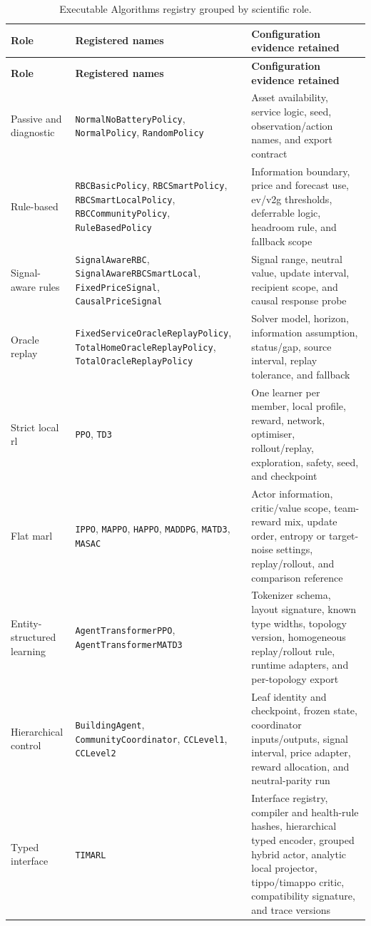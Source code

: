 \begin{longtable}{@{}p{}p{}p{}@{}}
\caption{Executable Algorithms registry grouped by scientific role.}\label{tab:app-controller-registry}\\
\toprule
\textbf{Role} & \textbf{Registered names} & \textbf{Configuration evidence retained} \\
\midrule
\endfirsthead
\toprule
\textbf{Role} & \textbf{Registered names} & \textbf{Configuration evidence retained} \\
\midrule
\endhead
Passive and diagnostic & \texttt{NormalNoBatteryPolicy}, \texttt{NormalPolicy}, \texttt{RandomPolicy} & Asset availability, service logic, seed, observation/action names, and export contract \\
Rule-based & \texttt{RBCBasicPolicy}, \texttt{RBCSmartPolicy}, \texttt{RBCSmartLocalPolicy}, \texttt{RBCCommunityPolicy}, \texttt{RuleBasedPolicy} & Information boundary, price and forecast use, \gls{ev}/\gls{v2g} thresholds, deferrable logic, headroom rule, and fallback scope \\
Signal-aware rules & \texttt{SignalAwareRBC}, \texttt{SignalAwareRBC\allowbreak SmartLocal}, \texttt{FixedPriceSignal}, \texttt{CausalPriceSignal} & Signal range, neutral value, update interval, recipient scope, and causal response probe \\
Oracle replay & \texttt{FixedServiceOracle\allowbreak ReplayPolicy}, \texttt{TotalHomeOracle\allowbreak ReplayPolicy}, \texttt{TotalOracleReplay\allowbreak Policy} & Solver model, horizon, information assumption, status/gap, source interval, replay tolerance, and fallback \\
Strict local \gls{rl} & \texttt{PPO}, \texttt{TD3} & One learner per member, local profile, reward, network, optimiser, rollout/replay, exploration, safety, seed, and checkpoint \\
Flat \gls{marl} & \texttt{IPPO}, \texttt{MAPPO}, \texttt{HAPPO}, \texttt{MADDPG}, \texttt{MATD3}, \texttt{MASAC} & Actor information, critic/value scope, team-reward mix, update order, entropy or target-noise settings, replay/rollout, and comparison reference \\
Entity-structured learning & \texttt{AgentTransformerPPO}, \texttt{AgentTransformerMATD3} & Tokenizer schema, layout signature, known type widths, topology version, homogeneous replay/rollout rule, runtime adapters, and per-topology export \\
Hierarchical control & \texttt{BuildingAgent}, \texttt{CommunityCoordinator}, \texttt{CCLevel1}, \texttt{CCLevel2} & Leaf identity and checkpoint, frozen state, coordinator inputs/outputs, signal interval, price adapter, reward allocation, and neutral-parity run \\
Typed interface & \texttt{TIMARL} & Interface registry, compiler and health-rule hashes, hierarchical typed encoder, grouped hybrid actor, analytic local projector, \gls{tippo}/\gls{timappo} critic, compatibility signature, and trace versions \\
\bottomrule
\end{longtable}

